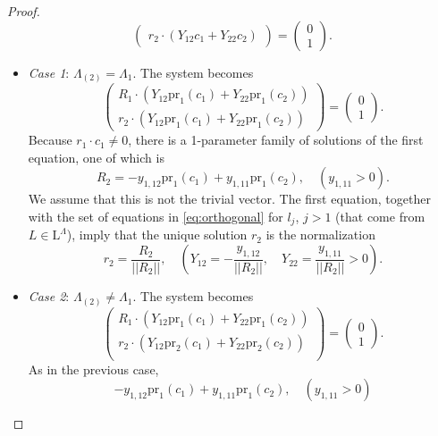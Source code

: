\documentclass[reqno]{amsart}
\newcommand{\pr}{\mathrm{pr}}
\renewcommand{\L}{\mathrm{L}}
\theoremstyle{definition} %
\begin{document}
\begin{proof}
\[\begin{pmatrix}
  r_2\cdot (Y_{12}c_1+Y_{22}c_2)\end{pmatrix}
   =\begin{pmatrix} 0\\1\end{pmatrix}.\]
  \begin{itemize}
\item \emph{Case 1}: $\Lambda_{(2)}=\Lambda_1$. The system becomes
\[
   \begin{pmatrix} R_1\cdot (Y_{12}\pr_1(c_1)+ Y_{22}\pr_1(c_2))\\
  r_2\cdot (Y_{12}\pr_1(c_1)+Y_{22}\pr_1(c_2))\end{pmatrix}
   =\begin{pmatrix} 0\\1\end{pmatrix}.\]
   Because $r_1\cdot c_1\neq 0$, there is a 1-parameter family of solutions of the first equation, one of which is
  \[R_2=-y_{1,12}\pr_{1}(c_1)+ y_{1,11}\pr_{1}(c_2),\quad (y_{1,11}>0).\]
  We  assume that this is not the trivial vector.
The first equation, together with the set of equations in  \eqref{eq:orthogonal} for $l_j$, $j>1$ (that come from  $L\in \L^\Lambda$), imply that the unique solution  $r_2$ is the normalization
\[r_2=\frac{R_2}{||R_2||},\quad (Y_{12}=-\frac{y_{1,12}}{||R_2||},\quad Y_{22}=\frac{y_{1,11}}{||R_2||}>0).\]
   \item \emph{Case 2}: $\Lambda_{(2)}\neq  \Lambda_1$. The system becomes
    \[\begin{pmatrix} R_1\cdot (Y_{12}\pr_{1}(c_1) +Y_{22}\pr_{1}(c_2))\\
  r_2\cdot (Y_{12}\pr_{2}(c_1)+Y_{22}\pr_{2}( c_2))\\
   \end{pmatrix}
   =\begin{pmatrix} 0\\1\end{pmatrix}.\]
   As in the previous case,
 \[-y_{1,12}\pr_{1}(c_1)+ y_{1,11}\pr_{1}(c_2),\quad (y_{1,11}>0)\]

\end{itemize}
\end{proof}
\end{document}
